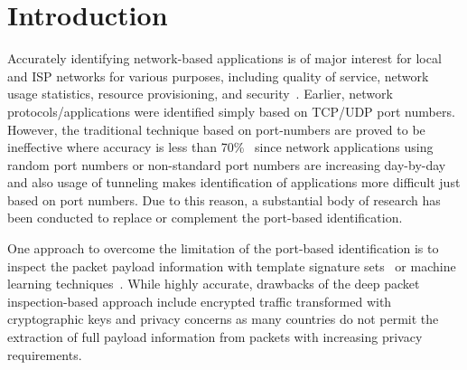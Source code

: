 \documentclass[conference]{IEEEtran}
\begin{document}




%



\section{Introduction}

Accurately identifying network-based applications is of major interest for local and ISP networks for various purposes, including
quality of service, network usage statistics, resource provisioning, and security~\cite{Bernaille:2006:EAI:1368436.1368445, DBLP:conf/iwcmc/GrimaudoMB12, DBLP:conf/infocom/XieIKFN12}.
Earlier, network protocols/applications were identified simply based on TCP/UDP port numbers.
However, the traditional technique based on port-numbers are proved to be ineffective where accuracy is less than 70\%~\cite{ACAS} since network applications using random port numbers or non-standard port numbers are increasing day-by-day and also usage of tunneling makes identification of applications more difficult just based on port numbers.
Due to this reason, a substantial body of research has been conducted to replace or complement the port-based identification. 

One approach to overcome the limitation of the port-based identification is to inspect the packet payload information with template signature sets~\cite{conf/IEEEcit/YeXWP09,DBLP:conf/noms/ParkWKH08} or machine learning techniques~\cite{ACAS}.
While highly accurate,  drawbacks of the deep packet inspection-based approach include encrypted traffic transformed with cryptographic keys and privacy concerns as many countries do not permit the extraction of full payload information from packets with increasing privacy requirements.
\end{document}
